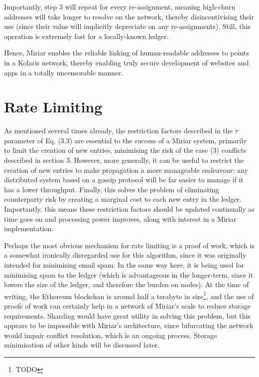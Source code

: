 \documentclass{extreport}
\begin{document}
Importantly, step 3 will repeat for every re-assignment, meaning high-churn addresses will take longer to resolve on the network, thereby disincentivising their use (since their value will implicitly depreciate on any re-assignments). Still, this operation is extremely fast for a locally-known ledger.

Hence, Miriar enables the reliable linking of human-readable addresses to points in a Kolaris network, thereby enabling truly secure development of websites and apps in a totally uncensorable manner.

\chapter{Rate Limiting}
\label{sec:org9f56f8d}

As mentioned several times already, the restriction factors described in the \(\tau\) parameter of Eq. (3.3) are essential to the success of a Miriar system, primarily to limit the creation of new entries, minimising the risk of the case (3) conflicts described in section 3. However, more generally, it can be useful to restrict the creation of new entries to make propagation a more manageable endeavour: any distributed system based on a gossip protocol will be far easier to manage if it has a lower throughput. Finally, this solves the problem of eliminating counterparty risk by creating a marginal cost to each new entry in the ledger. Importantly, this means these restriction factors should be updated continually as time goes on and processing power improves, along with interest in a Miriar implementation.

Perhaps the most obvious mechanism for rate limiting is a proof of work, which is a somewhat ironically disregarded use for this algorithm, since it was originally intended for minimising email spam. In the same way here, it is being used for minimising spam to the ledger (which is advantageous in the longer-term, since it lowers the size of the ledger, and therefore the burden on nodes). At the time of writing, the Ethereum blockchan is around half a terabyte in size\footnote{TODO}, and the use of proofs of work can certainly help in a network of Miriar's scale to reduce storage requirements. Sharding would have great utility in solving this problem, but this appears to be impossible with Miriar's architecture, since bifurcating the network would impair conflict resolution, which is an ongoing process. Storage minimisation of other kinds will be discussed later.
\end{document}
